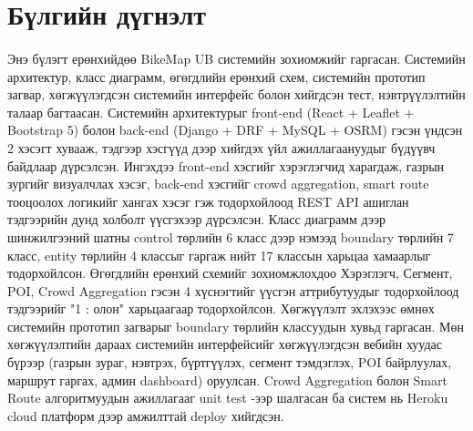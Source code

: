\section{Бүлгийн дүгнэлт}
\paragraph{} Энэ бүлэгт ерөнхийдөө BikeMap UB системийн зохиомжийг гаргасан. Системийн архитектур, класс диаграмм, өгөгдлийн ерөнхий схем, системийн прототип загвар, хөгжүүлэгдсэн системийн интерфейс болон хийгдсэн тест, нэвтрүүлэлтийн талаар багтаасан. Системийн архитектурыг front-end (React + Leaflet + Bootstrap 5) болон back-end (Django + DRF + MySQL + OSRM) гэсэн үндсэн 2 хэсэгт хувааж, тэдгээр хэсгүүд дээр хийгдэх үйл ажиллагаануудыг бүдүүвч байдлаар дүрсэлсэн. Ингэхдээ front-end хэсгийг хэрэглэгчид харагдаж, газрын зургийг визуалчлах хэсэг, back-end хэсгийг crowd aggregation, smart route тооцоолох логикийг хангах хэсэг гэж тодорхойлоод REST API ашиглан тэдгээрийн дунд холболт үүсгэхээр дүрсэлсэн. Класс диаграмм дээр шинжилгээний шатны control төрлийн 6 класс дээр нэмээд boundary төрлийн 7 класс, entity төрлийн 4 классыг гаргаж нийт 17 классын харьцаа хамаарлыг тодорхойлсон. Өгөгдлийн ерөнхий схемийг зохиомжлохдоо Хэрэглэгч, Сегмент, POI, Crowd Aggregation гэсэн 4 хүснэгтийг үүсгэн аттрибутуудыг тодорхойлоод тэдгээрийг "1 : олон" харьцаагаар тодорхойлсон. Хөгжүүлэлт эхлэхээс өмнөх системийн прототип загварыг boundary төрлийн классуудын хувьд гаргасан. Мөн хөгжүүлэлтийн дараах системийн интерфейсийг хөгжүүлэгдсэн вебийн хуудас бүрээр (газрын зураг, нэвтрэх, бүртгүүлэх, сегмент тэмдэглэх, POI байрлуулах, маршрут гаргах, админ dashboard) оруулсан. Crowd Aggregation болон Smart Route алгоритмуудын ажиллагааг unit test -ээр шалгасан ба систем нь Heroku cloud платформ дээр амжилттай deploy хийгдсэн.
